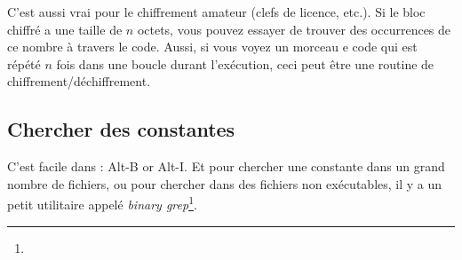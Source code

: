 C'est aussi vrai pour le chiffrement amateur (clefs de licence, etc.).
Si le bloc chiffré a une taille de $n$ octets, vous pouvez essayer de trouver des
occurrences de ce nombre à travers le code.
Aussi, si vous voyez un morceau e code qui est répété $n$ fois dans une boucle durant
l'exécution, ceci peut être une routine de chiffrement/déchiffrement.

\subsection{Chercher des constantes}

C'est facile dans \IDA: Alt-B or Alt-I.
Et pour chercher une constante dans un grand nombre de fichiers, ou pour chercher
dans des fichiers non exécutables, il y a un petit utilitaire appelé \emph{binary grep}\footnote{\BGREPURL}.

